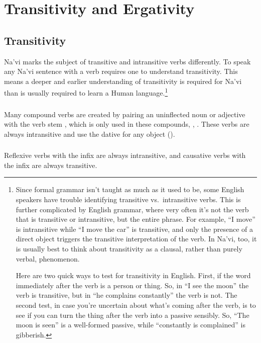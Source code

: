 
\section{Transitivity and Ergativity}

\subsection{Transitivity} Na'vi marks the subject of transitive and
intransitive verbs differently.  To speak any Na'vi sentence
with a verb requires one to understand transitivity.  This means a
deeper and earlier understanding of transitivity is required for Na'vi
than is usually required to learn a Human language.\footnote{Since
formal grammar isn't taught as much as it used to be, some English
speakers have trouble identifying transitive vs.\ intransitive
verbs.  This is further complicated by English grammar, where very
often it's not the verb that is transitive or intransitive, but the
entire phrase.  For example, ``I move'' is intransitive while ``I
move the car'' is transitive, and only the presence of a direct
object triggers the transitive interpretation of the verb.  In
Na'vi, too, it is usually best to think about transitivity as a
clausal, rather than purely verbal, phenomenon.

Here are two quick ways to test for transitivity in English.  First,
if the word immediately after the verb is a person or thing.  So, in
``I see the moon'' the verb is transitive, but in ``he complains
constantly'' the verb is not.  The second test, in case you're
uncertain about what's coming after the verb, is to see if you can
turn the thing after the verb into a passive sensibly.  So, ``The moon
is seen'' is a well-formed passive, while ``constantly is complained''
is gibberish.}

\subsubsection{} Many compound verbs are created by pairing an
uninflected noun or adjective with the verb stem  , which is only used in these compounds,  ,  .  These verbs are always
intransitive and use the dative for any object
().

\subsubsection{} Reflexive verbs with the  infix are
always intransitive, and causative verbs with the  infix
are always transitive.

